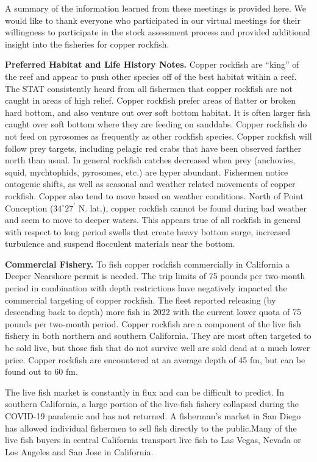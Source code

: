 \documentclass[11pt,
  english,
  letterpaper,
]{article}
\begin{document}
A summary of the information learned from these meetings is provided here. We would like to thank everyone who participated in our virtual meetings for their willingness to participate in the stock assessment process and provided additional insight into the fisheries for copper rockfish.

\textbf{Preferred Habitat and Life History Notes.} Copper rockfish are ``king'' of the reef and appear to push other species off of the best habitat within a reef. The STAT consistently heard from all fishermen that copper rockfish are not caught in areas of high relief. Copper rockfish prefer areas of flatter or broken hard bottom, and also venture out over soft bottom habitat. It is often larger fish caught over soft bottom where they are feeding on sanddabs. Copper rockfish do not feed on pyrosomes as frequently as other rockfish species. Copper rockfish will follow prey targets, including pelagic red crabs that have been observed farther north than usual. In general rockfish catches decreased when prey (anchovies, squid, mychtophids, pyrosomes, etc.) are hyper abundant. Fishermen notice ontogenic shifts, as well as seasonal and weather related movements of copper rockfish. Copper also tend to move based on weather conditions. North of Point Conception ($34^\circ 27^\prime$ N. lat.), copper rockfish cannot be found during bad weather and seem to move to deeper waters. This appears true of all rockfish in general with respect to long period swells that create heavy bottom surge, increased turbulence and suspend flocculent materials near the bottom.

\textbf{Commercial Fishery.} To fish copper rockfish commercially in California a Deeper Nearshore permit is needed. The trip limits of 75 pounds per two-month period in combination with depth restrictions have negatively impacted the commercial targeting of copper rockfish. The fleet reported releasing (by descending back to depth) more fish in 2022 with the current lower quota of 75 pounds per two-month period. Copper rockfish are a component of the live fish fishery in both northern and southern California. They are most often targeted to be sold live, but those fish that do not survive well are sold dead at a much lower price. Copper rockfish are encountered at an average depth of 45 fm, but can be found out to 60 fm.

The live fish market is constantly in flux and can be difficult to predict. In southern California, a large portion of the live-fish fishery collapsed during the COVID-19 pandemic and has not returned. A fisherman's market in San Diego has allowed individual fishermen to sell fish directly to the public.Many of the live fish buyers in central California transport live fish to Las Vegas, Nevada or Los Angeles and San Jose in California.
\end{document}
